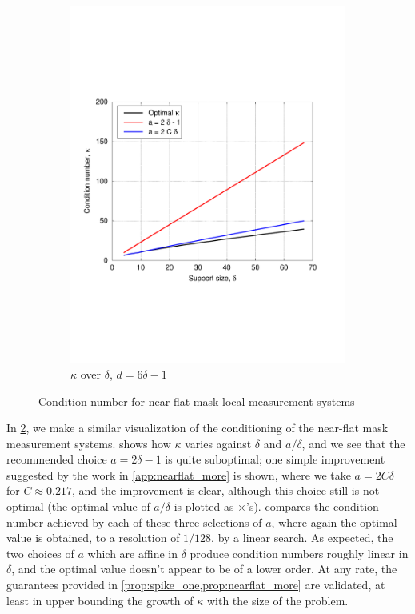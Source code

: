 \begin{figure}
\begin{subfigure}[b]{.49\textwidth}
      \includegraphics[width=\textwidth,trim={.2in 2.5in 1in 2.5in}]{figs/flatchart}
      \caption{$\kappa$ over $\delta$, $d = 6 \delta - 1$}
      \label{fig:flatchart}
    \end{subfigure}
    
    \caption{Condition number for near-flat mask local measurement systems}
    \label{fig:flat_kappa}
  \end{figure}

In \cref{fig:flat_kappa}, we make a similar visualization of the conditioning of the near-flat mask measurement systems.   shows how $\kappa$ varies against $\delta$ and $a / \delta$, and we see that the recommended choice $a = 2 \delta - 1$ is quite suboptimal; one simple improvement suggested by the work in \cref{app:nearflat_more} is shown, where we take $a = 2 C \delta$ for $C \approx 0.217$, and the improvement is clear, although this choice still is not optimal (the optimal value of $a / \delta$ is plotted as $\times$'s).   compares the condition number achieved by each of these three selections of $a$, where again the optimal value is obtained, to a resolution of $1 / 128$, by a linear search.  As expected, the two choices of $a$ which are affine in $\delta$ produce condition numbers roughly linear in $\delta$, and the optimal value doesn't appear to be of a lower order.  At any rate, the guarantees provided in \cref{prop:spike_one,prop:nearflat_more} are validated, at least in upper bounding the growth of $\kappa$ with the size of the problem.

